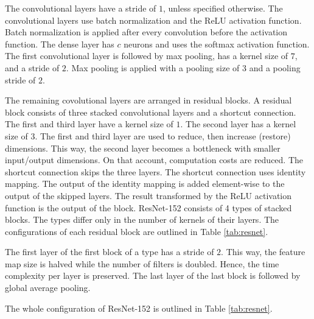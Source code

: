The convolutional layers have a stride of $1$, unless specified otherwise.
The convolutional layers use batch normalization and the \ac{ReLU} activation function.
Batch normalization is applied after every convolution before the activation function.
The dense layer has $c$ neurons and uses the softmax activation function.
The first convolutional layer is followed by max pooling, has a kernel size of $7$, and a stride of $2$.
Max pooling is applied with a pooling size of $3$ and a pooling stride of $2$. \autocite{He.2016}
\par
The remaining covolutional layers are arranged in residual blocks. A residual block consists of three stacked convolutional layers and a shortcut connection. The first and third layer have a kernel size of $1$. The second layer has a kernel size of $3$. The first and third layer are used to reduce, then increase (restore) dimensions. This way, the second layer becomes a bottleneck with smaller input/output dimensions. On that account, computation costs are reduced.
The shortcut connection skips the three layers. The shortcut connection uses identity mapping. The output of the identity mapping is added element-wise to the output of the skipped layers. The result transformed by the \ac{ReLU} activation function is the output of the block.
ResNet-152 consists of 4 types of stacked blocks. The types differ only in the number of kernels of their layers. The configurations of each residual block are outlined in Table \ref{tab:resnet}. \autocite{He.2016} 
\par
The first layer of the first block of a type has a stride of $2$. This way, the feature map size is halved while the number of filters is doubled. Hence, the time complexity per layer is preserved.
The last layer of the last block is followed by global average pooling. \autocite{He.2016}
\par
The whole configuration of ResNet-152 is outlined in Table \ref{tab:resnet}. \autocite{He.2016}
